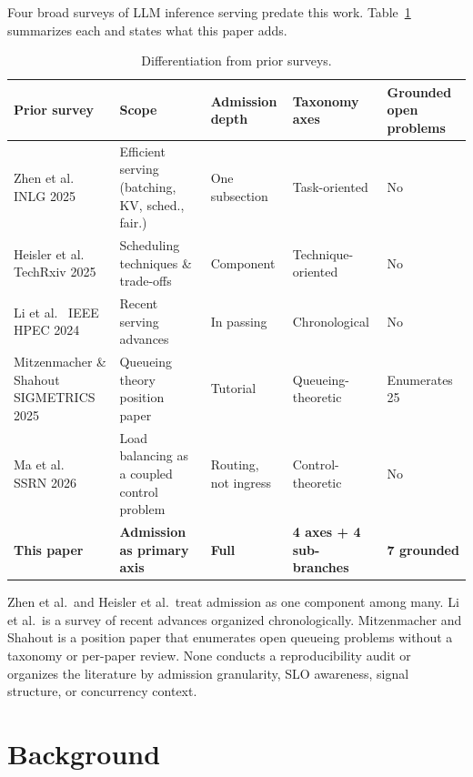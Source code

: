 \documentclass[10pt]{article} %
\theoremstyle{definition}
\begin{document}
Four broad surveys of LLM inference serving predate this work.
Table~\ref{tab:diff} summarizes each and states what this paper adds.

\begin{table}[htbp]
\centering
\caption{Differentiation from prior surveys.}
\label{tab:diff}
\small
{}
\begin{tabular}{p{3.4cm} p{3.2cm} p{2.2cm} p{2.4cm} p{2cm}}
\toprule
\rowcolor{admitteallight}
\textbf{Prior survey} & \textbf{Scope} & \textbf{Admission depth} & \textbf{Taxonomy axes} & \textbf{Grounded open problems} \\
\midrule
Zhen et al.\ \citep{zhen2025titans} INLG 2025 & Efficient serving (batching, KV, sched., fair.) & One subsection & Task-oriented & No \\
Heisler et al.\ \citep{heisler2025survey} TechRxiv 2025 & Scheduling techniques \& trade-offs & Component & Technique-oriented & No \\
Li et al.\ \citep{li2024surveyllm} IEEE HPEC 2024 & Recent serving advances & In passing & Chronological & No \\
Mitzenmacher \& Shahout \citep{mitzenmacher2025queueing} SIGMETRICS 2025 & Queueing theory position paper & Tutorial & Queueing-theoretic & Enumerates 25 \\
Ma et al.\ \citep{ma2026loadbalancing} SSRN 2026 & Load balancing as a coupled control problem & Routing, not ingress & Control-theoretic & No \\
\rowcolor{admitgreylight}
\textbf{This paper} & \textbf{Admission as primary axis} & \textbf{Full} & \textbf{4 axes + 4 sub-branches} & \textbf{7 grounded} \\
\bottomrule
\end{tabular}
\end{table}

Zhen et al.\ and Heisler et al.\ treat admission as one component among
many. Li et al.\ is a survey of recent advances organized
chronologically. Mitzenmacher and Shahout is a position paper that
enumerates open queueing problems without a taxonomy or per-paper
review. None conducts a reproducibility audit or organizes the
literature by admission granularity, SLO awareness, signal structure,
or concurrency context.

\section{Background}
\label{sec:bg}
\end{document}
